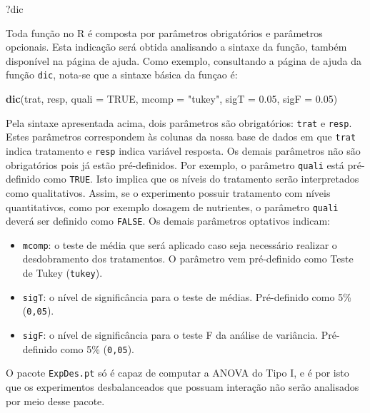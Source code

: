 \documentclass[
]{article}
\newenvironment{Shaded}{\begin{snugshade}}{\end{snugshade}}
\newcommand{\DataTypeTok}[1]{\textcolor[rgb]{0.13,0.29,0.53}{#1}}
\newcommand{\FloatTok}[1]{\textcolor[rgb]{0.00,0.00,0.81}{#1}}
\newcommand{\KeywordTok}[1]{\textcolor[rgb]{0.13,0.29,0.53}{\textbf{#1}}}
\newcommand{\NormalTok}[1]{#1}
\newcommand{\OtherTok}[1]{\textcolor[rgb]{0.56,0.35,0.01}{#1}}
\newcommand{\StringTok}[1]{\textcolor[rgb]{0.31,0.60,0.02}{#1}}
\providecommand{\tightlist}{%
  \setlength{\itemsep}{0pt}\setlength{\parskip}{0pt}}
\begin{document}
\begin{Shaded}
\begin{Highlighting}[]
\NormalTok{?dic}
\end{Highlighting}
\end{Shaded}

Toda função no R é composta por parâmetros obrigatórios e parâmetros opcionais. Esta indicação será obtida analisando a sintaxe da função, também disponível na página de ajuda. Como exemplo, consultando a página de ajuda da função \texttt{dic}, nota-se que a sintaxe básica da funçao é:

\begin{Shaded}
\begin{Highlighting}[]
\KeywordTok{dic}\NormalTok{(trat, resp, }\DataTypeTok{quali =} \OtherTok{TRUE}\NormalTok{, }\DataTypeTok{mcomp =} \StringTok{"tukey"}\NormalTok{, }\DataTypeTok{sigT =} \FloatTok{0.05}\NormalTok{, }\DataTypeTok{sigF =} \FloatTok{0.05}\NormalTok{)}
\end{Highlighting}
\end{Shaded}

Pela sintaxe apresentada acima, dois parâmetros são obrigatórios: \texttt{trat} e \texttt{resp}. Estes parâmetros correspondem às colunas da nossa base de dados em que \texttt{trat} indica tratamento e \texttt{resp} indica variável resposta. Os demais parâmetros não são obrigatórios pois já estão pré-definidos. Por exemplo, o parâmetro \texttt{quali} está pré-definido como \texttt{TRUE}. Isto implica que os níveis do tratamento serão interpretados como qualitativos. Assim, se o experimento possuir tratamento com níveis quantitativos, como por exemplo dosagem de nutrientes, o parâmetro \texttt{quali} deverá ser definido como \texttt{FALSE}. Os demais parâmetros optativos indicam:

\begin{itemize}
\tightlist
\item
  \texttt{mcomp}: o teste de média que será aplicado caso seja necessário realizar o desdobramento dos tratamentos. O parâmetro vem pré-definido como Teste de Tukey (\texttt{tukey}).
\item
  \texttt{sigT}: o nível de significância para o teste de médias. Pré-definido como 5\% (\texttt{0,05}).
\item
  \texttt{sigF}: o nível de significância para o teste F da análise de variância. Pré-definido como 5\% (\texttt{0,05}).
\end{itemize}

O pacote \texttt{ExpDes.pt} só é capaz de computar a ANOVA do Tipo I, e é por isto que os experimentos desbalanceados que possuam interação não serão analisados por meio desse pacote.
\end{document}
